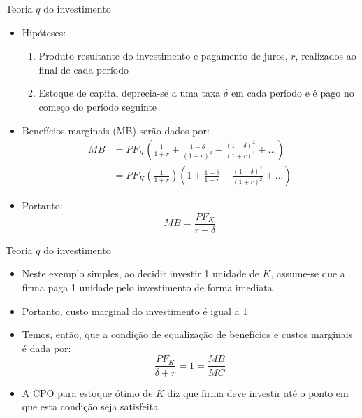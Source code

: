 \documentclass[10pt]{beamer}
\begin{document}
\begin{frame}
    {Teoria $q$ do investimento}
    \begin{itemize}
        \item Hipóteses:
        \begin{enumerate}
            \item Produto resultante do investimento e pagamento de juros, $r$, realizados ao final de cada período\medskip
            \item Estoque de capital deprecia-se a uma taxa $\delta$ em cada período e é pago no começo do período seguinte
        \end{enumerate}
        \item Benefícios marginais (MB) serão dados por:
        \begin{align}
            MB &= PF_K\left(\frac{1}{1 + r} + \frac{1-\delta}{(1 + r)^2} + \frac{(1-\delta)^2}{(1 + r)^3} + \dots\right) \nonumber \\
            &= PF_K \left(\frac{1}{1 + r}\right)\left(1 + \frac{1-\delta}{1 + r} + \frac{(1-\delta)^2}{(1 + r)^2} + \dots\right)\label{aula8_eq2}
        \end{align}
        \item Portanto:
        \begin{equation}
            MB = \frac{PF_K}{r + \delta}\label{aula8_eq3}
        \end{equation}
    \end{itemize}
\end{frame}

\begin{frame}
    {Teoria $q$ do investimento}
    \begin{itemize}
        \item Neste exemplo simples, ao decidir investir 1 unidade de $K$, assume-se que a firma paga 1 unidade pelo investimento de forma imediata\bigskip
        \item Portanto, custo marginal do investimento é igual a 1\bigskip
        \item Temos, então, que a condição de equalização de benefícios e custos marginais é dada por:
        \begin{equation}
            \frac{PF_K}{\delta + r} = 1 = \frac{MB}{MC}\label{aula8_eq4}
        \end{equation}
        \item A CPO para estoque ótimo de $K$ diz que firma deve investir até o ponto em que esta condição seja satisfeita
    \end{itemize}
\end{frame}
\end{document}
